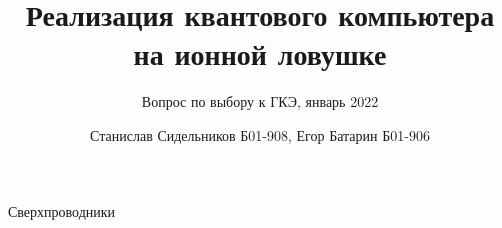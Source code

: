 \documentclass{beamer}
\title{Реализация квантового компьютера на ионной ловушке}
\subtitle{Вопрос по выбору к ГКЭ, январь 2022}
\author{Станислав Сидельников Б01-908, Егор Батарин Б01-906}
\institute{Московский физико-технический институт}
\date{}
\begin{document}
	
	\begin{frame}
		\titlepage
	\end{frame}

	\begin{frame}
		Сверхпроводники
	\end{frame}
	
\end{document}
